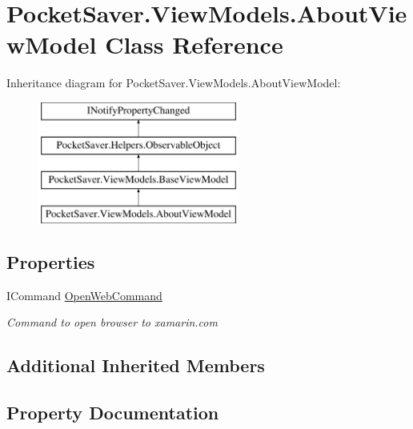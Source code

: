 \hypertarget{class_pocket_saver_1_1_view_models_1_1_about_view_model}{}\section{Pocket\+Saver.\+View\+Models.\+About\+View\+Model Class Reference}
\label{class_pocket_saver_1_1_view_models_1_1_about_view_model}
Inheritance diagram for Pocket\+Saver.\+View\+Models.\+About\+View\+Model\+:\begin{figure}[H]
\begin{center}
\leavevmode
\includegraphics[height=4.000000cm]{class_pocket_saver_1_1_view_models_1_1_about_view_model}
\end{center}
\end{figure}
\subsection*{Properties}
\begin{DoxyCompactItemize}
\item 
I\+Command \hyperlink{class_pocket_saver_1_1_view_models_1_1_about_view_model_a05bca2ba82a3e0d0b231d177f3990e66}{Open\+Web\+Command}
\begin{DoxyCompactList}\small\item\em Command to open browser to xamarin.\+com \end{DoxyCompactList}\end{DoxyCompactItemize}
\subsection*{Additional Inherited Members}


\subsection{Property Documentation}
\mbox{\label{class_pocket_saver_1_1_view_models_1_1_about_view_model_a05bca2ba82a3e0d0b231d177f3990e66}} 
